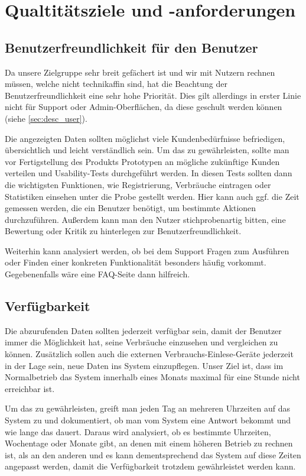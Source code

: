 \section{Qualtitätsziele und -anforderungen}
\label{quality_requirements}

\subsection{Benutzerfreundlichkeit für den Benutzer}
Da unsere Zielgruppe sehr breit gefächert ist und wir mit Nutzern rechnen müssen, welche nicht technikaffin sind,
hat die Beachtung der Benutzerfreundlichkeit eine sehr hohe Priorität.
Dies gilt allerdings in erster Linie nicht für Support oder Admin-Oberflächen, da diese geschult werden können (siehe \ref{sec:desc_user}).

Die angezeigten Daten sollten möglichst viele Kundenbedürfnisse
befriedigen, übersichtlich und leicht verständlich sein.
Um das zu gewährleisten, sollte man vor Fertigstellung des Produkts Prototypen an mögliche zukünftige Kunden verteilen
und Usability-Tests durchgeführt werden.
In diesen Tests sollten dann die wichtigsten Funktionen, wie Registrierung, Verbräuche eintragen oder Statistiken einsehen
unter die Probe gestellt werden.
Hier kann auch ggf. die Zeit gemessen werden, die ein Benutzer benötigt, um bestimmte Aktionen durchzuführen.
Außerdem kann man den Nutzer stichprobenartig bitten, eine Bewertung oder Kritik zu hinterlegen zur Benutzerfreundlichkeit.

Weiterhin kann analysiert werden, ob bei dem Support Fragen zum Ausführen oder Finden einer konkreten Funktionalität besonders häufig vorkommt.
Gegebenenfalls wäre eine FAQ-Seite dann hilfreich.

\subsection{Verfügbarkeit}
Die abzurufenden Daten sollten jederzeit verfügbar sein,
damit der Benutzer immer die Möglichkeit hat,
seine Verbräuche einzusehen und vergleichen zu können.
Zusätzlich sollen auch die externen Verbrauchs-Einlese-Geräte jederzeit in der Lage sein, neue Daten ins System
einzupflegen.
Unser Ziel ist, dass im Normalbetrieb das System innerhalb eines Monats maximal für eine Stunde nicht erreichbar ist.

Um das zu gewährleisten, greift man jeden Tag an mehreren Uhrzeiten auf das System zu
und dokumentiert, ob man vom System eine Antwort bekommt und wie lange das dauert.
Daraus wird analysiert, ob es bestimmte Uhrzeiten, Wochentage oder Monate gibt,
an denen mit einem höheren Betrieb zu rechnen ist, als an den anderen und es kann dementsprechend das
System auf diese Zeiten angepasst werden, damit die Verfügbarkeit trotzdem gewährleistet werden kann.

